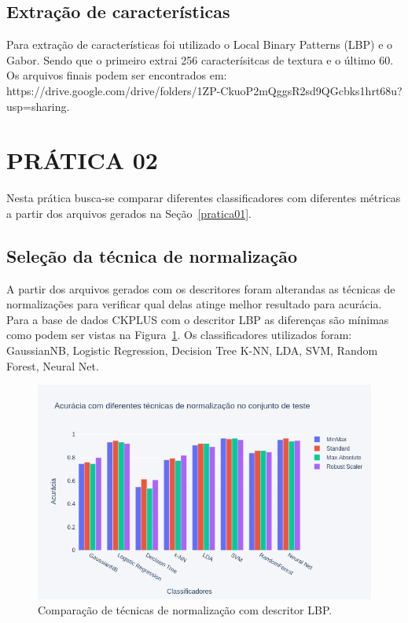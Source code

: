 \documentclass[a4paper, 12 pt, conference]{ieeeconf}  %
\begin{document}
\subsection{Extração de características}
Para extração de características foi utilizado o Local Binary Patterns (LBP) e o Gabor. Sendo que o primeiro extrai 256 caracterísitcas de textura e o último 60. Os arquivos finais podem ser encontrados em: https://drive.google.com/drive/folders/1ZP-CkuoP2mQggsR2sd9QGcbks1hrt68u?usp=sharing.

\section{PRÁTICA 02}
\label{pratica02}
Nesta prática busca-se comparar diferentes classificadores com diferentes métricas a partir dos arquivos gerados na Seção~\ref{pratica01}.

\subsection{Seleção da técnica de normalização}
A partir dos arquivos gerados com os descritores foram alterandas as técnicas de normalizações para verificar qual delas atinge melhor resultado para acurácia. Para a base de dados CKPLUS com o descritor LBP as diferenças são mínimas como podem ser vistas na Figura~\ref{fig:bar_norm_all}. Os classificadores utilizados foram: GaussianNB, Logistic Regression, Decision Tree K-NN, LDA, SVM, Random Forest, Neural Net.

\begin{figure}[!htbp]
	\centering
	\includegraphics[width=1.0\linewidth,clip=true,trim=0cm 0cm 0cm 0cm, keepaspectratio=true]{bar_norm_all.png}
	\caption{Comparação de técnicas de normalização com descritor LBP.}
	\label{fig:bar_norm_all}
\end{figure}
\end{document}
